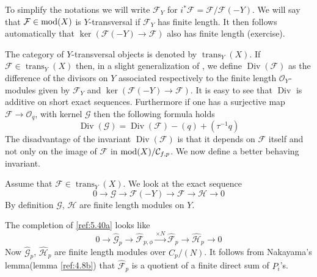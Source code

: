 \documentclass{amsproc}
\def\Cscr{{\mathcal C}}
\def\Fscr{{\mathcal F}}
\def\Gscr{{\mathcal G}}
\def\Hscr{{\mathcal H}}
\def\Oscr{{\mathcal O}}
\def\mod{\mathop{\text{mod}}}
\def\trans{\operatorname{trans}}
\def\Div{\operatorname{Div}}
\def\ker{\operatorname {ker}}
\def\r{\rightarrow}
\let\oldtext\text
\def\text#1{\oldtext{\upshape #1}}
\theoremstyle{definition}
\theoremstyle{remark}
\numberwithin{equation}{section}
\numberwithin{table}{section}
\numberwithin{figure}{section}
\begin{document}
To simplify the notations we will write $\Fscr_Y$ for
$i^\ast\Fscr=\Fscr/\Fscr(-Y)$.  We will say that $\Fscr\in\mod(X)$ is
$Y$-transversal if $\Fscr_Y$ has finite length. It then
follows automatically that $\ker (\Fscr(-Y)\r \Fscr)$ also has finite
length (exercise).

The category of $Y$-transversal objects is denoted by $\trans_Y(X)$.
If $\Fscr\in \trans_Y(X)$ then, in a slight generalization of
\cite{Ajitabh,VdB23}, we define $\Div(\Fscr)$ as the difference of the
divisors on $Y$  associated respectively to the finite
length $\Oscr_Y$-modules given by $\Fscr_Y$ and $\ker (\Fscr(-Y)\r
\Fscr)$.  It is easy to see that $\Div$ is additive on short exact
sequences.  Furthermore if one has a surjective map $\Fscr\r \Oscr_q$,
with kernel $\Gscr$ then the following formula holds \cite{VdB23}
\begin{equation}
\label{ref:5.39a}
\Div(\Gscr)=\Div(\Fscr)-(q)+(\tau^{-1} q)
\end{equation}
The disadvantage of the invariant $\Div(\Fscr)$ is that it depends on
$\Fscr$ itself and not only on the image of $\Fscr$ in
$\mod(X)/\Cscr_{f,p}$. We now define a
better behaving invariant.

Assume that $\Fscr\in \trans_Y(X)$. We look at
 the exact sequence
\begin{equation}
\label{ref:5.40a}
0\r \Gscr\r \Fscr(-Y)\r \Fscr\r \Hscr\r 0
\end{equation}
By definition $\Gscr$, $\Hscr$ are finite length modules on $Y$.

The completion of \eqref{ref:5.40a} looks like
\begin{equation}
\label{ref:5.41a}
0\r  \hat{\Gscr}_p\r \hat{\Fscr}_{p,\phi}\xrightarrow{\times N} \hat{\Fscr}_p
\r \hat{\Hscr}_p\r 0 
\end{equation}
Now $\hat{\Gscr}_p$, $\hat{\Hscr}_p$ are finite length modules over
$C_p/(N)$. It follows from Nakayama's lemma(lemma \ref{ref:4.8b}) that
$\hat{\Fscr}_p$ is a quotient of a finite direct sum of $P_i$'s.
\end{document}
